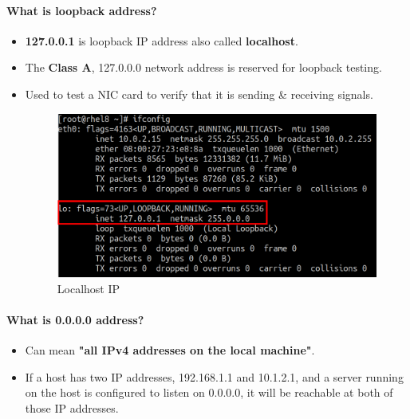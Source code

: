 \setlength{\columnsep}{3pt}
\begin{flushleft}

\paragraph{What is loopback address?}
\begin{itemize}
	\item \textbf{127.0.0.1} is loopback IP address also called \textbf{localhost}.
	\item The \textbf{Class A}, 127.0.0.0 network address is reserved for loopback testing.
	\item Used to test a NIC card to verify that it is sending \& receiving signals.
	
	\begin{figure}[h!]
		\centering
		\includegraphics[scale=.35]{content/chapter14/images/loopback.png}
		\caption{Localhost IP}
		\label{fig:localhost_new}
	\end{figure}	
\end{itemize}

\paragraph{What is 0.0.0.0 address?}

\begin{itemize}
	\item Can mean \textbf{"all IPv4 addresses on the local machine"}.
	\item If a host has two IP addresses, 192.168.1.1 and 10.1.2.1, and a server running on the host is configured to listen on 0.0.0.0, it will be reachable at both of those IP addresses.
\end{itemize}



\end{flushleft}
\newpage